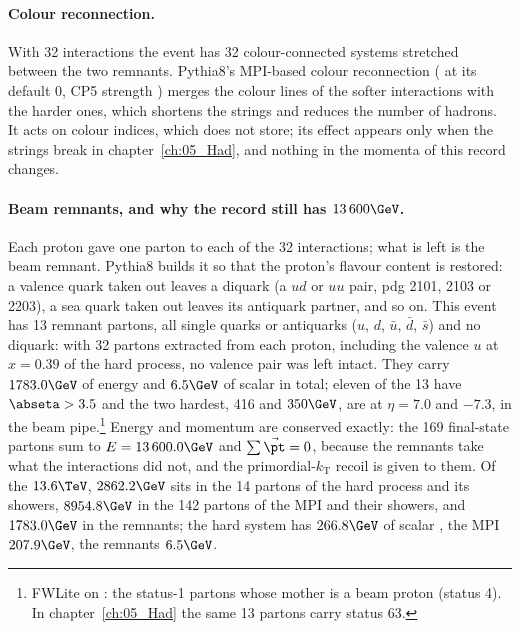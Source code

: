 \paragraph{Colour reconnection.}
With 32 interactions the event has 32 colour-connected systems stretched between the two remnants. Pythia8's
MPI-based colour reconnection ( at its default 0, CP5 strength )
merges the colour lines of the softer interactions with the harder ones, which shortens the strings and reduces
the number of hadrons. It acts on colour indices, which  does not store; its effect appears
only when the strings break in chapter~\ref{ch:05_Had}, and nothing in the momenta of this record changes.

\paragraph{Beam remnants, and why the record still has $13\,600\GeV$.}
Each proton gave one parton to each of the 32 interactions; what is left is the beam remnant. Pythia8 builds it so that the proton's flavour content is restored: a
valence quark taken out leaves a diquark (a $ud$ or $uu$ pair, pdg 2101, 2103 or 2203), a sea quark taken out
leaves its antiquark partner, and so on. This event has 13 remnant partons, all single quarks or antiquarks
($u$, $d$, $\bar u$, $\bar d$, $\bar s$) and no diquark: with 32 partons extracted from each proton,
including the valence $u$ at $x=0.39$ of the hard process, no valence pair was left intact. They carry
$1783.0\GeV$ of energy and $6.5\GeV$ of scalar \pt{} in total; eleven of the 13 have $\abseta>3.5$ and the
two hardest, 416 and $350\GeV$, are at $\eta=7.0$ and $-7.3$, in the beam pipe.\footnote{FWLite on
: the status-1 partons whose mother is a beam proton (status 4). In chapter~\ref{ch:05_Had}
the same 13 partons carry status 63.} Energy and momentum are conserved exactly: the 169 final-state partons sum
to $E=13\,600.0\GeV$ and $\sum\vec\pt=0$, because the remnants take what the interactions did not, and the
primordial-$k_\mathrm{T}$ recoil is given to them. Of the $13.6\TeV$, $2862.2\GeV$ sits in the 14 partons of
the hard process and its showers, $8954.8\GeV$ in the 142 partons of the MPI and their showers, and
$1783.0\GeV$ in the remnants; the hard system has $266.8\GeV$ of scalar \pt, the MPI $207.9\GeV$, the remnants
$6.5\GeV$.


